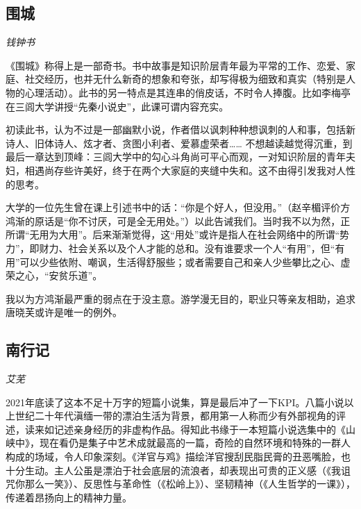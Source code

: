 \subsection*{围城}
\par \emph{钱钟书} 
\par 《围城》称得上是一部奇书。书中故事是知识阶层青年最为平常的工作、恋爱、家庭、社交经历，也并无什么新奇的想象和夸张，却写得极为细致和真实（特别是人物的心理活动）。此书的另一特点是其连串的俏皮话，不时令人捧腹。比如李梅亭在三闾大学讲授“先秦小说史”，此课可谓内容充实。
\par 初读此书，认为不过是一部幽默小说，作者借以讽刺种种想讽刺的人和事，包括新诗人、旧体诗人、炫才者、贪图小利者、爱慕虚荣者…… 不想越读越觉得沉重，到最后一章达到顶峰：三闾大学中的勾心斗角尚可平心而观，一对知识阶层的青年夫妇，相遇尚存些许美好，终于在两个大家庭的夹缝中失和。这不由得引发我对人性的思考。
\par 大学的一位先生曾在课上引述书中的话：“你是个好人，但没用。”（赵辛楣评价方鸿渐的原话是“你不讨厌，可是全无用处。”）以此告诫我们。当时我不以为然，正所谓“无用为大用”。后来渐渐觉得，这“用处”或许是指人在社会网络中的所谓“势力”，即财力、社会关系以及个人才能的总和。没有谁要求一个人“有用”，但“有用”可以少些依附、嘲讽，生活得舒服些；或者需要自己和亲人少些攀比之心、虚荣之心，“安贫乐道”。
\par 我以为方鸿渐最严重的弱点在于没主意。游学漫无目的，职业只等亲友相助，追求唐晓芙或许是唯一的例外。
\par {}

\subsection*{南行记}
\par \emph{艾芜} 
\par 2021年底读了这本不足十万字的短篇小说集，算是最后冲了一下KPI。八篇小说以上世纪二十年代滇缅一带的漂泊生活为背景，都用第一人称而少有外部视角的评述，读来如记述亲身经历的非虚构作品。得知此书缘于一本短篇小说选集中的《山峡中》，现在看仍是集子中艺术成就最高的一篇，奇险的自然环境和特殊的一群人构成的场域，令人印象深刻。《洋官与鸡》描绘洋官搜刮民脂民膏的丑恶嘴脸，也十分生动。主人公虽是漂泊于社会底层的流浪者，却表现出可贵的正义感（《我诅咒你那么一笑》）、反思性与革命性（《松岭上》）、坚韧精神（《人生哲学的一课》），传递着昂扬向上的精神力量。
\par {}

